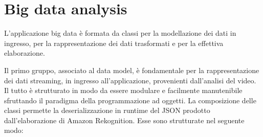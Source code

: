 \section{Big data analysis}
L’applicazione big data è formata da classi per la modellazione dei dati in ingresso, per la rappresentazione dei dati trasformati e per la effettiva elaborazione. %

Il primo gruppo, associato al data model, è fondamentale per la rappresentazione dei dati streaming, in ingresso all’applicazione, provenienti dall’analisi del video. Il tutto è strutturato in modo da essere modulare e facilmente manutenibile sfruttando il paradigma della programmazione ad oggetti. La composizione delle classi permette la deserializzazione in runtime del JSON prodotto dall’elaborazione di Amazon Rekognition. %
Esse sono strutturate nel seguente modo:


